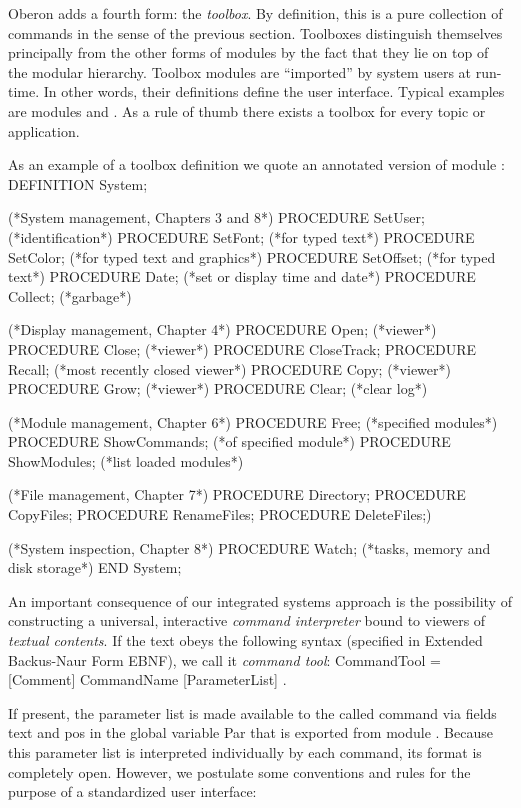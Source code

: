 Oberon adds a fourth form: the \emph{toolbox}. By definition, this is a pure
collection of commands in the sense of the previous section. Toolboxes
distinguish themselves principally from the other forms of modules by
the fact that they lie on top of the modular hierarchy. Toolbox
modules are ``imported'' by system users at run-time. In other words,
their definitions define the user interface. Typical examples are
modules  and . As a rule of thumb there exists a toolbox for
every topic or application.

As an example of a toolbox definition we quote an annotated version of
module :
\begintt
DEFINITION System;

(*System management, Chapters 3 and 8*)
  PROCEDURE SetUser; (*identification*)
  PROCEDURE SetFont; (*for typed text*)
  PROCEDURE SetColor; (*for typed text and graphics*)
  PROCEDURE SetOffset; (*for typed text*)
  PROCEDURE Date; (*set or display time and date*)
  PROCEDURE Collect; (*garbage*)
  
(*Display management, Chapter 4*)
  PROCEDURE Open; (*viewer*)
  PROCEDURE Close; (*viewer*)
  PROCEDURE CloseTrack;
  PROCEDURE Recall; (*most recently closed viewer*)
  PROCEDURE Copy; (*viewer*)
  PROCEDURE Grow; (*viewer*)
  PROCEDURE Clear; (*clear log*)
  
(*Module management, Chapter 6*)
  PROCEDURE Free; (*specified modules*)
  PROCEDURE ShowCommands; (*of specified module*)
  PROCEDURE ShowModules; (*list loaded modules*)
  
(*File management, Chapter 7*)
  PROCEDURE Directory;
  PROCEDURE CopyFiles;
  PROCEDURE RenameFiles;
  PROCEDURE DeleteFiles;)
  
(*System inspection, Chapter 8*)
  PROCEDURE Watch; (*tasks, memory and disk storage*)
END System;
\endtt

\noindent An important consequence of our integrated systems approach is the
possibility of constructing a universal, interactive 
\emph{command interpreter} bound to viewers of \emph{textual contents}. If the text obeys
the following syntax (specified in Extended Backus-Naur Form EBNF), we
call it \emph{command tool}:
\begintt
CommandTool = { [Comment] CommandName [ParameterList] }.
\endtt

\noindent If present, the parameter list is made available to the called command
via fields text and pos in the global variable Par that is exported
from module . Because this parameter list is interpreted
individually by each command, its format is completely open. However,
we postulate some conventions and rules for the purpose of a
standardized user interface:

